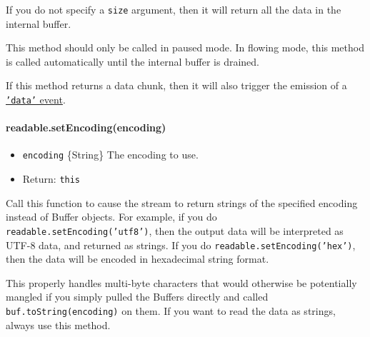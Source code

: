 If you do not specify a \texttt{size} argument, then it will return all
the data in the internal buffer.

This method should only be called in paused mode. In flowing mode, this
method is called automatically until the internal buffer is drained.

\begin{Shaded}
\end{Shaded}

If this method returns a data chunk, then it will also trigger the
emission of a \hyperref[stream\_event\_data]{\texttt{'data'} event}.

\paragraph{readable.setEncoding(encoding)}

\begin{itemize}
\item
  \texttt{encoding} \{String\} The encoding to use.
\item
  Return: \texttt{this}
\end{itemize}

Call this function to cause the stream to return strings of the
specified encoding instead of Buffer objects. For example, if you do
\texttt{readable.setEncoding('utf8')}, then the output data will be
interpreted as UTF-8 data, and returned as strings. If you do
\texttt{readable.setEncoding('hex')}, then the data will be encoded in
hexadecimal string format.

This properly handles multi-byte characters that would otherwise be
potentially mangled if you simply pulled the Buffers directly and called
\texttt{buf.toString(encoding)} on them. If you want to read the data as
strings, always use this method.

